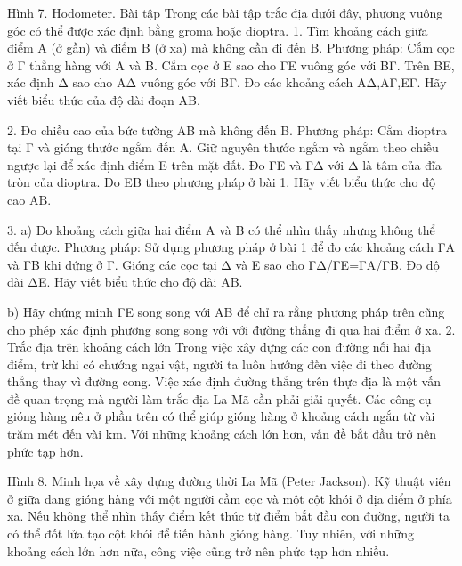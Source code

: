 \begin{multicols}{2}
	Hình 7. Hodometer.
	Bài tập
	Trong các bài tập trắc địa dưới đây, phương vuông góc có thể được xác định bằng groma hoặc dioptra.
	1. Tìm khoảng cách giữa điểm A (ở gần) và điểm B (ở xa) mà không cần đi đến B. 
	Phương pháp: Cắm cọc ở Γ thẳng hàng với A và B. Cắm cọc ở E sao cho ΓE vuông góc với BΓ. Trên BE, xác định Δ sao cho AΔ vuông góc với BΓ. Đo các khoảng cách AΔ,AΓ,EΓ. 
	Hãy viết biểu thức của độ dài đoạn AB.
	
	2. Đo chiều cao của bức tường AB mà không đến B. 
	Phương pháp: Cắm dioptra tại Γ và gióng thước ngắm đến A. Giữ nguyên thước ngắm và ngắm theo chiều ngược lại để xác định điểm E trên mặt đất. Đo ΓE và ΓΔ với Δ là tâm của đĩa tròn của dioptra. Đo EB theo phương pháp ở bài 1. 
	Hãy viết biểu thức cho độ cao AB.  
	
	3. a) Đo khoảng cách giữa hai điểm A và B có thể nhìn thấy nhưng không thể đến được. 
	Phương pháp: Sử dụng phương pháp ở bài 1 để đo các khoảng cách ΓA và ΓB khi đứng ở Γ. Gióng các cọc tại Δ và E sao cho ΓΔ/ΓE=ΓA/ΓB. Đo độ dài ΔE. 
	Hãy viết biểu thức cho độ dài AB.
	
	b) Hãy chứng minh ΓE song song với AB để chỉ ra rằng phương pháp trên cũng cho phép xác định phương song song với với đường thẳng đi qua hai điểm ở xa.
	2. Trắc địa trên khoảng cách lớn
	Trong việc xây dựng các con đường nối hai địa điểm, trừ khi có chướng ngại vật, người ta luôn hướng đến việc đi theo đường thẳng thay vì đường cong. Việc xác định đường thẳng trên thực địa là một vấn đề quan trọng mà người làm trắc địa La Mã cần phải giải quyết. Các công cụ gióng hàng nêu ở phần trên có thể giúp gióng hàng ở khoảng cách ngắn từ vài trăm mét đến vài km. Với những khoảng cách lớn hơn, vấn đề bắt đầu trở nên phức tạp hơn.
	
	Hình 8. Minh họa về xây dựng đường thời La Mã (Peter Jackson). Kỹ thuật viên ở giữa đang gióng hàng với một người cầm cọc và một cột khói ở địa điểm ở phía xa.
	Nếu không thể nhìn thấy điểm kết thúc từ điểm bắt đầu con đường, người ta có thể đốt lửa tạo cột khói để tiến hành gióng hàng. Tuy nhiên, với những khoảng cách lớn hơn nữa, công việc cũng trở nên phức tạp hơn nhiều. 
	

\end{multicols}
